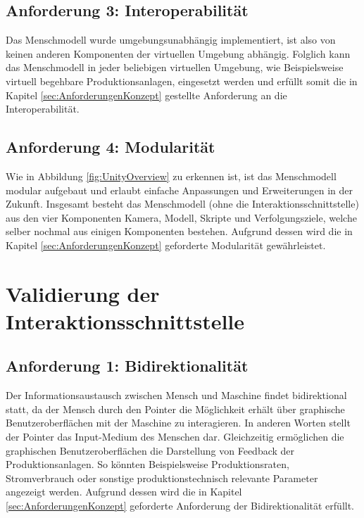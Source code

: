 \subsection{Anforderung 3: Interoperabilität}
Das Menschmodell wurde umgebungsunabhängig implementiert, ist also von keinen anderen Komponenten der virtuellen Umgebung abhängig. Folglich kann das Menschmodell in jeder beliebigen virtuellen Umgebung, wie Beispielsweise virtuell begehbare Produktionsanlagen, eingesetzt werden und erfüllt somit die in Kapitel \ref{sec:AnforderungenKonzept} gestellte Anforderung an die Interoperabilität.

\subsection{Anforderung 4: Modularität}
Wie in Abbildung \ref{fig:UnityOverview} zu erkennen ist, ist das Menschmodell modular aufgebaut und erlaubt einfache Anpassungen und Erweiterungen in der Zukunft. Insgesamt besteht das Menschmodell (ohne die Interaktionsschnittstelle) aus den vier Komponenten Kamera, Modell, Skripte und Verfolgungsziele, welche selber nochmal aus einigen Komponenten bestehen. Aufgrund dessen wird die in Kapitel \ref{sec:AnforderungenKonzept} geforderte Modularität gewährleistet.

\section{Validierung der Interaktionsschnittstelle}\label{sec:ValidInteraktion}

\subsection{Anforderung 1: Bidirektionalität}
Der Informationsaustausch zwischen Mensch und Maschine findet bidirektional statt, da der Mensch durch den Pointer die Möglichkeit erhält über graphische Benutzeroberflächen mit der Maschine zu interagieren. In anderen Worten stellt der Pointer das Input-Medium des Menschen dar. Gleichzeitig ermöglichen die graphischen Benutzeroberflächen die Darstellung von Feedback der Produktionsanlagen. So könnten Beispielsweise Produktionsraten, Stromverbrauch oder sonstige produktionstechnisch relevante Parameter angezeigt werden. Aufgrund dessen wird die in Kapitel \ref{sec:AnforderungenKonzept} geforderte Anforderung der Bidirektionalität erfüllt.

